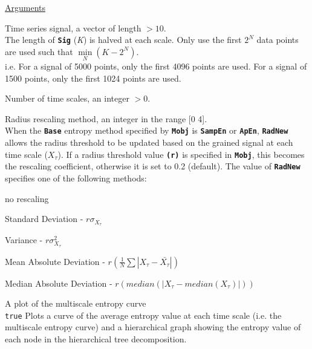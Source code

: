 \documentclass[12pt, a4paper, titlepage, openany]{book}
\begin{document}
\noindent \ul{Arguments}
\begin{description}[labelsep=1cm, labelwidth=2cm, nosep, style=multiline,leftmargin=3cm]\footnotesize
\item[\texttt{Sig}]		Time series signal, a vector of length $> 10$.\\
	The length of \texttt{\textbf{Sig}} (\emph{K}) is halved at each scale. Only use the first $2^N$ data points are used such that $\underset{N}{\min}(K - 2^N)$.\\
i.e. For a signal of 5000 points, only the first 4096 points are used. For a signal of 1500 points, only the first 1024 points are used.
\item[\texttt{Scales}]		Number of time scales, an integer  $> 0$.
\item[\texttt{RadNew}]			Radius rescaling method, an integer in the range [0 4].\\
				 When the \texttt{\textbf{Base}} entropy method specified by \texttt{\textbf{Mobj}} is \texttt{\textbf{SampEn}} or \texttt{\textbf{ApEn}}, \texttt{\textbf{RadNew}} allows the radius threshold to be updated based on the grained signal at each time scale ($X_\tau$). If a radius threshold value \texttt{\textbf{(r)}} is specified in \texttt{\textbf{Mobj}},  this becomes the rescaling coefficient, otherwise it is set to 0.2 (default). The value of \texttt{\textbf{RadNew}} specifies one of the following methods:
	\begin{description}[labelsep=5em, labelwidth=4em, nosep,style=multiline,leftmargin=2cm]
		\item[0]	no rescaling
		\item[1]    Standard Deviation          - $r\sigma_{X_\tau}$
        \item[2]    Variance                    - $r\sigma_{X_\tau}^2$
        \item[3]    Mean Absolute Deviation     - $r(\frac{1}{N} \sum |X_{\tau} - \bar{X_{\tau}}|) $
        \item[4]    Median Absolute Deviation   - $r(median(|X_{\tau} - median(X_{\tau})|)) $
	\end{description} 
\item[\texttt{Plotx}]		A plot of the multiscale entropy curve\\
							\texttt{true} \hspace{15pt} Plots a curve of the average entropy value at each time scale (i.e. the multiscale entropy curve) and a hierarchical graph showing the entropy value of each node     in the hierarchical tree decomposition.\\

\end{description}
\end{document}
